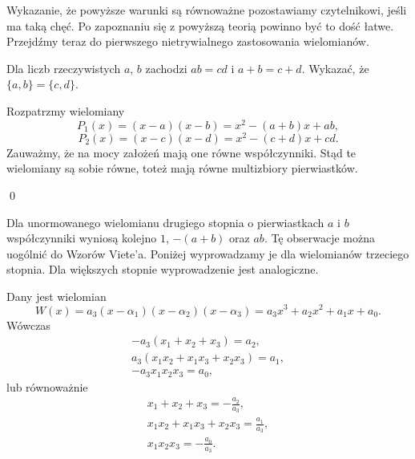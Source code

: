 \vspace{5px}
\noindent
Wykazanie, że powyższe warunki są równoważne pozostawiamy czytelnikowi, jeśli ma taką chęć. Po zapoznaniu się z powyższą teorią powinno być to dość łatwe. Przejdźmy teraz do pierwszego nietrywialnego zastosowania wielomianów.

\vspace{5px}


\noindent
Dla liczb rzeczywistych $a$, $b$ zachodzi $ab = cd$ i $a + b = c + d$. Wykazać, że $\{a, b\} = \{c, d\}$.

\vspace{5px}


\noindent
Rozpatrzmy wielomiany
\[
    P_1(x) = (x - a)(x - b) = x^2 - (a + b)x + ab,
\]
\[
    P_2(x) = (x - c)(x - d) = x^2 - (c + d)x + cd.
\]
Zauważmy, że na mocy założeń mają one równe współczynniki. Stąd te wielomiany są sobie równe, toteż mają równe multizbiory pierwiastków.

\qed

\vspace{5px}

\noindent
Dla unormowanego wielomianu drugiego stopnia o pierwiastkach $a$ i $b$ współczynniki wyniosą kolejno $1$, $-(a + b)$ oraz $ab$. Tę obserwacje można uogólnić do Wzorów Viete'a. Poniżej wyprowadzamy je dla wielomianów trzeciego stopnia. Dla większych stopnie wyprowadzenie jest analogiczne. 

\newpage


\noindent
Dany jest wielomian
\[
     W(x) = a_3(x - \alpha_1)(x - \alpha_2)(x - \alpha_3) = a_3x^3 + a_2x^2 + a_1x + a_0.
\]
Wówczas 
\begin{align*}
-a_3(x_1 + x_2 + x_3) = a_2, \\
a_3(x_1x_2 + x_1x_3 + x_2x_3) = a_1, \\
-a_3x_1x_2x_3 = a_0,
\end{align*}
lub równoważnie
\begin{align*}
x_1 + x_2 + x_3 = -\frac{a_2}{a_3}, \\
x_1x_2 + x_1x_3 + x_2x_3 = \frac{a_1}{a_3}, \\
x_1x_2x_3 = -\frac{a_0}{a_3}.
\end{align*}
